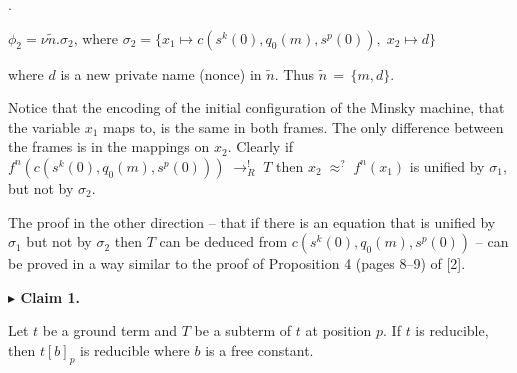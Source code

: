 \documentclass[10pt,a4paper]{amsart}
\begin{document}
 
 
\par{}. 
 
$\phi_{2}=\nu\tilde{n}.\sigma_{2}$, where $\sigma_{2}=\{x_{1}\mapsto c(s^{k}(0),q_{0}(m),s^{p}(0)),\;x_{2}\mapsto d\}$\par
 
 
  
where $d$ is a new private name (nonce) in $\tilde{n}$. Thus $\tilde{n}\,=\,\{m,d\}$.\par
 
 
 
Notice that the encoding of the initial configuration of the Minsky machine, that the variable $x_{1}$ maps to, is the same in both frames. The only difference between the frames is in the mappings on $x_{2}$. Clearly if $f^{n}(c(s^{k}(0),q_{0}(m),s^{p}(0)))\;\rightarrow_{R}^{!}\;T$ then $x_{2}\;\approx^{?}\;f^{n}(x_{1})$ is unified by $\sigma_{1}$, but not by $\sigma_{2}$.\par
 
 
 
The proof in the other direction – that if there is an equation that is unified by $\sigma_{1}$ but not by $\sigma_{2}$ then $T$ can be deduced from $c(s^{k}(0),q_{0}(m),s^{p}(0))$ – can be proved in a way similar to the proof of Proposition 4 (pages 8–9) of [2].\par
 
 
 
\par\medskip\noindent\textbf{$\blacktriangleright$ Claim 1.}\par
 
 
Let $t$ be a ground term and $T$ be a subterm of $t$ at position $p$. If $t$ is reducible, then $t[b]_{p}$ is reducible where $b$ is a free constant.\par
 
 
 
 
 
\end{document}
